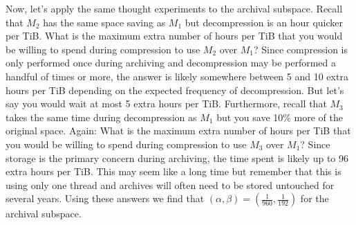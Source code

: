 Now, let's apply the same thought experiments to the archival subspace. Recall
that $M_2$ has the same space saving as $M_1$ but decompression is an hour
quicker per TiB. What is the maximum extra number of hours per TiB that you
would be willing to spend during compression to use $M_2$ over $M_1$? Since
compression is only performed once during archiving and decompression may be
performed a handful of times or more, the answer is likely somewhere between 5
and 10 extra hours per TiB depending on the expected frequency of decompression.
But let's say you would wait at most 5 extra hours per TiB. Furthermore, recall
that $M_3$ takes the same time during decompression as $M_1$ but you save
10\% more of the original space. Again: What is the maximum extra number
of hours per TiB that you would be willing to spend during compression to use
$M_3$ over $M_1$? Since storage is the primary concern during archiving, the
time spent is likely up to 96 extra hours per TiB. This may seem like a long
time but remember that this is using only one thread and archives will often
need to be stored untouched for several years. Using these answers we find that
$(\alpha,\beta)=(\frac{1}{960},\frac{1}{192})$ for the archival subspace.



